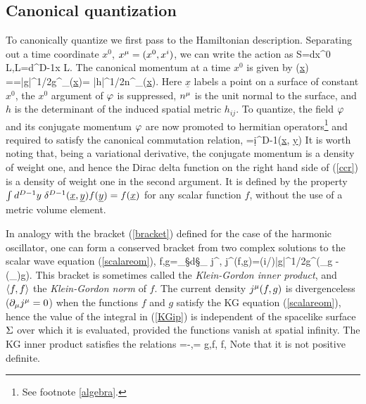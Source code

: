 \documentclass[12pt]{article}
\begin{document}
\subsection{Canonical quantization}
To canonically quantize we first pass to the Hamiltonian
description. Separating out a time coordinate $x^0$,
$x^\m=(x^0,x^i)$, we can write the action as
%
\beq S=\int dx^0\; L,\qquad\qquad L=\int d^{D-1}x\; {\cal L}. \eeq
%
The canonical momentum at a time $x^0$ is given by
%
\beq \pi(\underline{x}) ==|g|^{1/2}g^{}\p_\m\fphi(\underline{x})=
|h|^{1/2}n^{\m}\p_\m\fphi(\underline{x}).\label{momentum} \eeq
%
Here $\underline{x}$ labels a point on a surface of constant
$x^0$, the $x^0$ argument of $\fphi$ is suppressed, $n^\m$ is the
unit normal to the surface, and $h$ is the determinant of 
the induced spatial metric $h_{ij}$. To quantize, the
field $\fphi$ and its conjugate momentum $\fphi$ are now promoted
to hermitian operators\footnote{See footnote \ref{algebra}.}
and required to satisfy the canonical commutation relation,
%
=i\hbar\d^{D-1}(\underline{x}, \underline{y})
\label{ccr} \eeq
%
It is worth noting that, being a variational derivative, the
conjugate momentum is a density of weight one, and hence the
Dirac delta function on the right hand side of (\ref{ccr}) is
a density of weight one in the second argument. It is 
defined by the property 
$\int d^{D-1}y\; \d^{D-1}(\underline{x}, \underline{y}) f(\underline{y})=f(\underline{x})$
for any scalar function $f$, without the use of a metric volume element.

In analogy with the bracket (\ref{bracket}) defined for the case
of the harmonic oscillator, one can form a conserved bracket
from two complex solutions to the scalar wave equation
(\ref{scalareom}),
%
\beq \la f,g\ra=\int_\S d\S_\m\; j^\m, \qquad
j^\m(f,g)=(i/\hbar)|g|^{1/2}g^{\m\n}\Bigl(\p_\n g -
(\p_\n {})g\Bigr).\label{KGip}\eeq
%
This bracket is sometimes called the {\it Klein-Gordon inner product}, and $\la f,f\ra$ the {\it Klein-Gordon norm} of $f$.
The current density $j^\m(f,g)$ is divergenceless ($\p_\m j^\m=0$)
when the functions $f$ and $g$ satisfy the KG equation
(\ref{scalareom}), hence
the value of the integral in (\ref{KGip}) is independent of the
spacelike surface $\S$ over which it is evaluated, provided the
functions vanish at spatial infinity. The KG inner
product satisfies the relations
%
\beq {}=-\la {},\ra = \la g,f\ra,
\qquad\qquad \la f, \label{bracketrelns}\eeq
%
Note that it is not positive definite.
\end{document}
